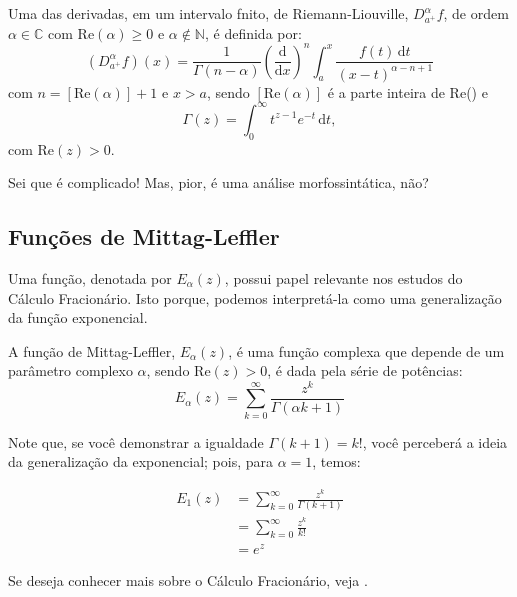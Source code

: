 \begin{definicao}
  Uma das derivadas, em um intervalo fnito, de Riemann-Liouville, 
  $ D_{a^{+}}^{\alpha} f $, de ordem $ \alpha \in \mathbb{C} $ com 
  $\textrm{Re}(\alpha) \geq 0$ e $ \alpha \not \in \mathbb{N}$, é definida por:
  \begin{equation}
    \left(D_{a^{+}}^{\alpha}f\right)(x) = 
    \frac{1}{\Gamma(n - \alpha)}
    \left(
      \frac{\mathrm{d}}{\mathrm{d}x}
    \right)^{n} 
    \int_{a}^{x} 
    \frac
    { 
      f(t)\, \mathrm{d}t
    }
    {
      (x - t)^{\alpha - n + 1}
    }
  \end{equation}
com $ n = \left[\textrm{Re}(\alpha)\right] + 1 $ e $ x > a $, sendo 
$ \left[\textrm{Re}(\alpha)\right] $ é a parte inteira de \textrm{Re}(\alpha) e 
\[
  \Gamma(z) = \int_{0}^{\infty} t^{z - 1} e^{-t}\, \mathrm{d}t,
\]
com $\textrm{Re}(z) > 0$.
\end{definicao}

Sei que é complicado!
Mas, pior, é uma análise morfossintática, não?  

\subsection{Funções de Mittag-Leffler}

Uma função, denotada por $E_{\alpha}(z)$, possui papel relevante nos estudos 
do Cálculo Fracionário. 
Isto porque, podemos interpretá-la como uma generalização da função exponencial. 

\begin{definicao}
  A função de Mittag-Leffler, $E_{\alpha}(z)$, é uma função complexa que depende 
  de um parâmetro complexo $\alpha$, sendo $ \textrm{Re}(z) > 0 $, é dada pela 
  série de potências:
  \[
    E_{\alpha}(z) = \sum_{k = 0}^{\infty} \frac{z^k}{\Gamma(\alpha k + 1)}
  \]
\end{definicao}

Note que, se você demonstrar a igualdade $\Gamma(k + 1) = k!$, você perceberá 
a ideia da generalização da exponencial; pois, para $ \alpha = 1 $, temos:

\begin{align*}
  E_{1}(z) &= \sum_{k = 0}^{\infty} \frac{z^k}{\Gamma(k + 1)} \\
           &= \sum_{k = 0}^{\infty} \frac{z^k}{k!} \\
           &= e^{z}
\end{align*}

Se deseja conhecer mais sobre o Cálculo Fracionário, veja \textcite{fracionario}.
